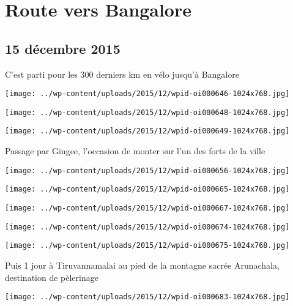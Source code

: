 \chapter{Route vers Bangalore}
\section*{15 décembre 2015}
C'est parti pour les 300 derniers km en vélo jusqu'à Bangalore \newline
 \newline
\centerline{\texttt{[image: ../wp-content/uploads/2015/12/wpid-oi000646-1024x768.jpg]} } 
 \newline
 \newline
\centerline{\texttt{[image: ../wp-content/uploads/2015/12/wpid-oi000648-1024x768.jpg]} } 
 \newline
 \newline
\centerline{\texttt{[image: ../wp-content/uploads/2015/12/wpid-oi000649-1024x768.jpg]} } 
 \newline
 Passage par Gingee, l'occasion de monter sur l'un des forts de la ville \newline
 \newline
\centerline{\texttt{[image: ../wp-content/uploads/2015/12/wpid-oi000656-1024x768.jpg]} } 
 \newline
 \newline
\centerline{\texttt{[image: ../wp-content/uploads/2015/12/wpid-oi000665-1024x768.jpg]} } 
 \newline
 \newline
\centerline{\texttt{[image: ../wp-content/uploads/2015/12/wpid-oi000667-1024x768.jpg]} } 
 \newline
 \newline
\centerline{\texttt{[image: ../wp-content/uploads/2015/12/wpid-oi000674-1024x768.jpg]} } 
 \newline
 \newline
\centerline{\texttt{[image: ../wp-content/uploads/2015/12/wpid-oi000675-1024x768.jpg]} } 
 \newline
 Puis 1 jour à Tiruvannamalai au pied de la montagne sacrée Arunachala, destination de pèlerinage \newline
 \newline
\centerline{\texttt{[image: ../wp-content/uploads/2015/12/wpid-oi000683-1024x768.jpg]} } 
 \newline
 \newline
